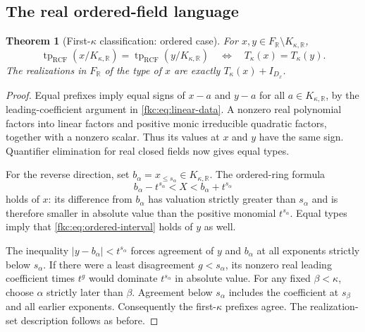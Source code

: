 \documentclass[11pt,letterpaper]{article}
\numberwithin{equation}{section}
\newtheorem{theorem}{Theorem}[section]
\theoremstyle{definition}
\theoremstyle{remark}
\newcommand{\R}{\mathbb R}
\newcommand{\tp}{\operatorname{tp}}
\newcommand{\RCF}{\mathrm{RCF}}
\newcommand{\KR}{K_{\kappa,\R}}
\newcommand{\FR}{F_{\R}}
\begin{document}
\subsection{The real ordered-field language}
\begin{theorem}[First-$\kappa$ classification: ordered case]\label{fkc:thm:real-type}
For $x,y\in\FR\setminus\KR$,
\begin{equation}\label{fkc:eq:real-type}
 \tp_{\RCF}(x/\KR)=\tp_{\RCF}(y/\KR)
 \quad\Longleftrightarrow\quad T_\kappa(x)=T_\kappa(y).
\end{equation}
The realizations in $\FR$ of the type of $x$ are exactly $T_\kappa(x)+I_{D_x}$.
\end{theorem}
\begin{proof}
Equal prefixes imply equal signs of $x-a$ and $y-a$ for all $a\in\KR$, by the leading-coefficient argument in \eqref{fkc:eq:linear-data}. A nonzero real polynomial factors into linear factors and positive monic irreducible quadratic factors, together with a nonzero scalar. Thus its values at $x$ and $y$ have the same sign. Quantifier elimination for real closed fields now gives equal types.

For the reverse direction, set $b_\alpha=x_{\le s_\alpha}\in\KR$. The ordered-ring formula
\begin{equation}\label{fkc:eq:ordered-interval}
 b_\alpha-t^{s_\alpha}<X<b_\alpha+t^{s_\alpha}
\end{equation}
holds of $x$: its difference from $b_\alpha$ has valuation strictly greater than $s_\alpha$ and is therefore smaller in absolute value than the positive monomial $t^{s_\alpha}$. Equal types imply that \eqref{fkc:eq:ordered-interval} holds of $y$ as well.

The inequality $|y-b_\alpha|<t^{s_\alpha}$ forces agreement of $y$ and $b_\alpha$ at all exponents strictly below $s_\alpha$. If there were a least disagreement $g<s_\alpha$, its nonzero real leading coefficient times $t^g$ would dominate $t^{s_\alpha}$ in absolute value. For any fixed $\beta<\kappa$, choose $\alpha$ strictly later than $\beta$. Agreement below $s_\alpha$ includes the coefficient at $s_\beta$ and all earlier exponents. Consequently the first-$\kappa$ prefixes agree. The realization-set description follows as before.
\end{proof}
\end{document}
